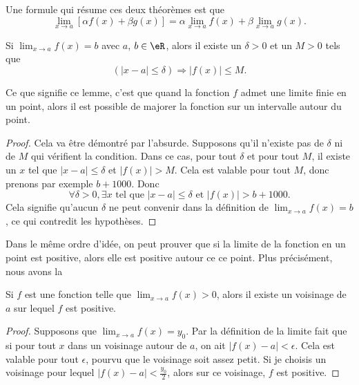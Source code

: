 Une formule qui résume ces deux théorèmes est que
\begin{equation}    \label{EqLimLinRes}
    \lim_{x\to a}[\alpha f(x)+\beta g(x)]=\alpha\lim_{x\to a}f(x)+\beta\lim_{x\to a}g(x).
\end{equation}

\begin{lemma}       \label{LemLimMajorableVois}
    Si $\lim_{x\to a}f(x)=b$ avec $a$, $b\in\eR$, alors il existe un $\delta>0$ et un $M>0$ tels que 
    \[ 
        (| x-a |\leq\delta)\Rightarrow | f(x) |\leq M.
    \]
\end{lemma}

Ce que signifie ce lemme, c'est que quand la fonction $f$ admet une limite finie en un point, alors il est possible de majorer la fonction sur un intervalle autour du point.

\begin{proof}
    Cela va être démontré par l'absurde. Supposons qu'il n'existe pas de $\delta$ ni de $M$ qui vérifient la condition. Dans ce cas, pour tout $\delta$ et pour tout $M$, il existe un $x$ tel que $| x-a |\leq\delta$ et $| f(x) |> M$. Cela est valable pour tout $M$, donc prenons par exemple $b+1000$. Donc 
    \begin{equation}
    \forall\delta>0,\exists x\text{ tel que } | x-a |\leq\delta\text{ et }| f(x) |>b+1000.
    \end{equation}
    Cela signifie qu'aucun $\delta$ ne peut convenir dans la définition de $\lim_{x\to a}f(x)=b$, ce qui contredit les hypothèses.
\end{proof}

Dans le même ordre d'idée, on peut prouver que si la limite de la fonction en un point est positive, alors elle est positive autour ce ce point. Plus précisément, nous avons la
\begin{proposition} \label{PropoLimPosFPos}
    Si $f$ est une fonction telle que $\lim_{x\to a}f(x)>0$, alors il existe un voisinage de $a$ sur lequel $f$ est positive.
\end{proposition}   

\begin{proof}
    Supposons que $\lim_{x\to a}f(x)=y_0$. Par la définition de la limite fait que si pour tout $x$ dans un voisinage autour de $a$, on ait $| f(x)-a |<\epsilon$. Cela est valable pour tout $\epsilon$, pourvu que le voisinage soit assez petit. Si je choisis un voisinage pour lequel $| f(x)-a |<\frac{ y_0 }{ 2 }$, alors sur ce voisinage, $f$ est positive.
\end{proof}

